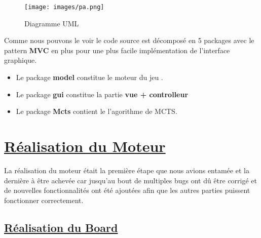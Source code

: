 \documentclass[12pt]{article}
\begin{document}
	\begin{figure}[h!]
		\begin{center}
			\texttt{[image: images/pa.png]}
		\end{center}
		\caption{Diagramme UML}
		\label{DU}
	\end{figure}
	Comme nous pouvons le voir le code source est décomposé en 5 packages avec le pattern \textbf{MVC} en plus pour une plus facile
	implémentation de l'interface graphique.
	\begin{itemize}
		\item Le package \textbf{model} constitue le moteur du jeu .
		\item Le package \textbf{gui} constitue la partie \textbf{vue + controlleur}
		\item Le package \textbf{Mcts} contient le l'agorithme de MCTS.
	\end{itemize}

	\section{\underline{Réalisation du Moteur}}
	La réalisation du moteur était la première étape que nous avions entamée et la dernière à être achevée car jusqu'au bout de multiples bugs ont dû être corrigé et de nouvelles fonctionnalités ont été ajoutées afin que les autres parties puissent fonctionner correctement.
	\subsection{\underline{Réalisation du Board}}
\end{document}
